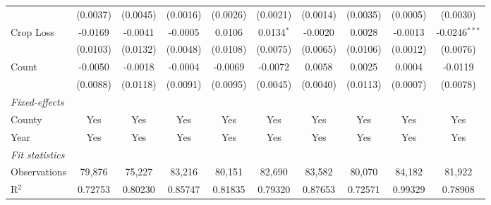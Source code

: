 \documentclass[letterpaper]{article}
\begin{document}
\begin{table}[H]
{\begin{tabular}{lccccccccc}
                        & (0.0037)                       & (0.0045)                      & (0.0016)                        & (0.0026)                        & (0.0021)                  & (0.0014)                      & (0.0035)                 & (0.0005)                & (0.0030)\\   
   Crop Loss                & -0.0169                        & -0.0041                       & -0.0005                         & 0.0106                          & 0.0134$^{*}$              & -0.0020                       & 0.0028                   & -0.0013                 & -0.0246$^{***}$\\   
                        & (0.0103)                       & (0.0132)                      & (0.0048)                        & (0.0108)                        & (0.0075)                  & (0.0065)                      & (0.0106)                 & (0.0012)                & (0.0076)\\   
   Count                & -0.0050                        & -0.0018                       & -0.0004                         & -0.0069                         & -0.0072                   & 0.0058                        & 0.0025                   & 0.0004                  & -0.0119\\   
                        & (0.0088)                       & (0.0118)                      & (0.0091)                        & (0.0095)                        & (0.0045)                  & (0.0040)                      & (0.0113)                 & (0.0007)                & (0.0078)\\   
   \midrule
   \emph{Fixed-effects}\\
   County               & Yes                            & Yes                           & Yes                             & Yes                             & Yes                       & Yes                           & Yes                      & Yes                     & Yes\\  
   Year                 & Yes                            & Yes                           & Yes                             & Yes                             & Yes                       & Yes                           & Yes                      & Yes                     & Yes\\  
   \midrule
   \emph{Fit statistics}\\
   Observations         & 79,876                         & 75,227                        & 83,216                          & 80,151                          & 82,690                    & 83,582                        & 80,070                   & 84,182                  & 81,922\\  
   R$^2$                & 0.72753                        & 0.80230                       & 0.85747                         & 0.81835                         & 0.79320                   & 0.87653                       & 0.72571                  & 0.99329                 & 0.78908\\  
  

\end{tabular}}
\end{table}
\end{document}
